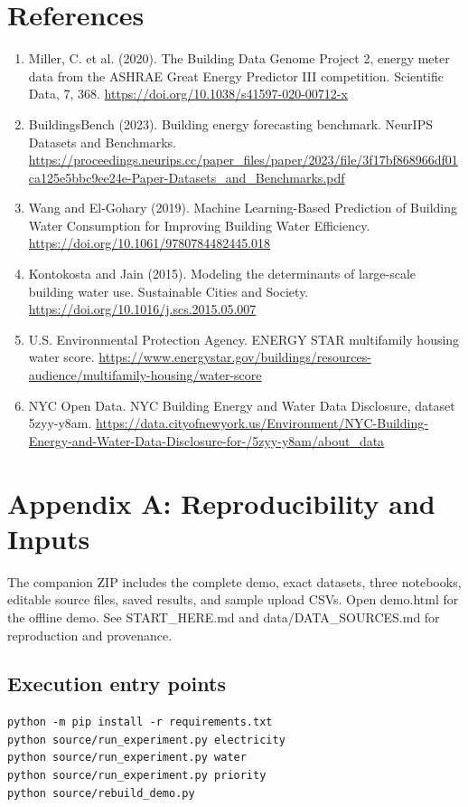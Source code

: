 \documentclass[12pt,a4paper]{article}
\begin{document}
\section*{References}
\begin{enumerate}
\item Miller, C. et al. (2020). The Building Data Genome Project 2, energy meter data from the ASHRAE Great Energy Predictor III competition. Scientific Data, 7, 368. \url{https://doi.org/10.1038/s41597-020-00712-x}
\item BuildingsBench (2023). Building energy forecasting benchmark. NeurIPS Datasets and Benchmarks. \url{https://proceedings.neurips.cc/paper_files/paper/2023/file/3f17bf868966df01ca125e5bbc9ee24e-Paper-Datasets_and_Benchmarks.pdf}
\item Wang and El-Gohary (2019). Machine Learning-Based Prediction of Building Water Consumption for Improving Building Water Efficiency. \url{https://doi.org/10.1061/9780784482445.018}
\item Kontokosta and Jain (2015). Modeling the determinants of large-scale building water use. Sustainable Cities and Society. \url{https://doi.org/10.1016/j.scs.2015.05.007}
\item U.S. Environmental Protection Agency. ENERGY STAR multifamily housing water score. \url{https://www.energystar.gov/buildings/resources-audience/multifamily-housing/water-score}
\item NYC Open Data. NYC Building Energy and Water Data Disclosure, dataset 5zyy-y8am. \url{https://data.cityofnewyork.us/Environment/NYC-Building-Energy-and-Water-Data-Disclosure-for-/5zyy-y8am/about_data}
\end{enumerate}\newpage
\section*{Appendix A: Reproducibility and Inputs}
The companion ZIP includes the complete demo, exact datasets, three notebooks, editable source files, saved results, and sample upload CSVs. Open demo.html for the offline demo. See START\_HERE.md and data/DATA\_SOURCES.md for reproduction and provenance.
\subsection*{Execution entry points}
\begin{verbatim}
python -m pip install -r requirements.txt
python source/run_experiment.py electricity
python source/run_experiment.py water
python source/run_experiment.py priority
python source/rebuild_demo.py
\end{verbatim}
\end{document}
